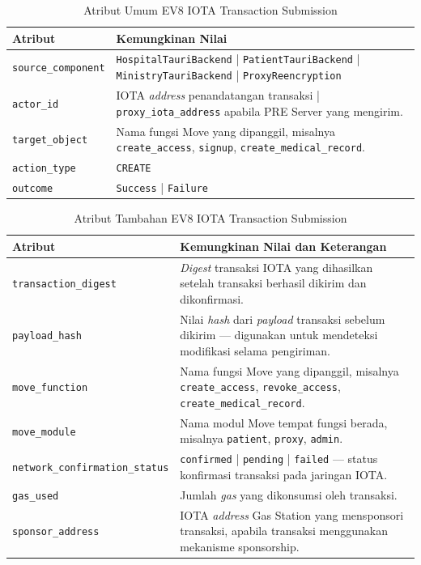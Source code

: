 \begin{table}[htbp]
\centering
\caption{Atribut Umum EV8 IOTA Transaction Submission}
\label{tab:ev8-umum}
\renewcommand{\arraystretch}{1.3}
\begin{tabular}{|p{3.5cm}|p{8.5cm}|}
\hline
\textbf{Atribut} & \textbf{Kemungkinan Nilai} \\
\hline
\texttt{source\_component} &
\texttt{HospitalTauriBackend} | \texttt{PatientTauriBackend} |
\texttt{MinistryTauriBackend} | \texttt{ProxyReencryption} \\
\hline
\texttt{actor\_id} &
IOTA \textit{address} penandatangan transaksi | \texttt{proxy\_iota\_address}
apabila PRE Server yang mengirim. \\
\hline
\texttt{target\_object} &
Nama fungsi Move yang dipanggil, misalnya \texttt{create\_access},
\texttt{signup}, \texttt{create\_medical\_record}. \\
\hline
\texttt{action\_type} &
\texttt{CREATE} \\
\hline
\texttt{outcome} &
\texttt{Success} | \texttt{Failure} \\
\hline
\end{tabular}
\end{table}

\begin{table}[htbp]
\centering
\caption{Atribut Tambahan EV8 IOTA Transaction Submission}
\label{tab:ev8-detail}
\renewcommand{\arraystretch}{1.3}
\begin{tabular}{|p{4cm}|p{7.5cm}|}
\hline
\textbf{Atribut} & \textbf{Kemungkinan Nilai dan Keterangan} \\
\hline
\texttt{transaction\_digest} &
\textit{Digest} transaksi IOTA yang dihasilkan setelah transaksi berhasil
dikirim dan dikonfirmasi. \\
\hline
\texttt{payload\_hash} &
Nilai \textit{hash} dari \textit{payload} transaksi sebelum dikirim ---
digunakan untuk mendeteksi modifikasi selama pengiriman. \\
\hline
\texttt{move\_function} &
Nama fungsi Move yang dipanggil, misalnya \texttt{create\_access},
\texttt{revoke\_access}, \texttt{create\_medical\_record}. \\
\hline
\texttt{move\_module} &
Nama modul Move tempat fungsi berada, misalnya \texttt{patient},
\texttt{proxy}, \texttt{admin}. \\
\hline
\texttt{network\_confirmation\_status} &
\texttt{confirmed} | \texttt{pending} | \texttt{failed} --- status
konfirmasi transaksi pada jaringan IOTA. \\
\hline
\texttt{gas\_used} &
Jumlah \textit{gas} yang dikonsumsi oleh transaksi. \\
\hline
\texttt{sponsor\_address} &
IOTA \textit{address} Gas Station yang mensponsori transaksi, apabila
transaksi menggunakan mekanisme sponsorship. \\
\hline
\end{tabular}
\end{table}

